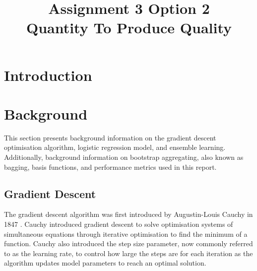 \documentclass[10pt, conference]{IEEEtran}
\begin{document}
\title{Assignment 3 Option 2 \\
Quantity To Produce Quality
}

\author{
}

\maketitle

\begin{abstract}

\end{abstract}

\section{Introduction}

\section{Background} \label{section: Background}

This section presents background information on the gradient descent optimisation algorithm, logistic
regression model, and ensemble learning. Additionally, background information on bootstrap aggregating,
also known as bagging, basis functions, and performance metrics used in this report.

\subsection{Gradient Descent}

The gradient descent algorithm was first introduced by Augustin-Louis Cauchy
in 1847 \cite{gradient_descent_ref}. Cauchy introduced gradient descent to solve optimisation
systems of simultaneous equations through iterative optimisation to find the minimum of a function.
Cauchy also introduced the step size parameter, now commonly referred to as the learning rate, to control
how large the steps are for each iteration as the algorithm updates model parameters to reach an optimal
solution.
\end{document}
